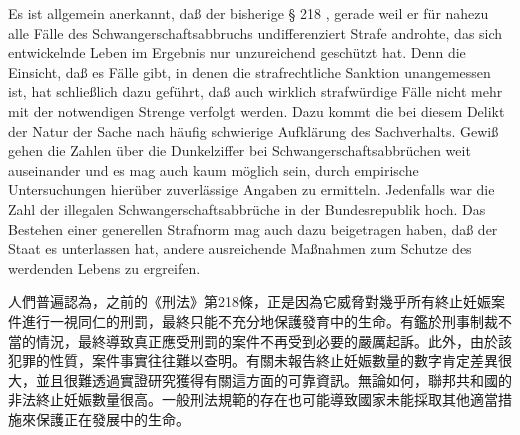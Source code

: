 \documentclass[12pt]{article}
\begin{document}
\syncleft
\begin{sourcepara}
Es ist allgemein anerkannt, daß der bisherige § 218 \abbrStGB{}, gerade weil er für nahezu alle Fälle des Schwangerschaftsabbruchs undifferenziert Strafe androhte, das sich entwickelnde Leben im Ergebnis nur unzureichend geschützt hat. Denn die Einsicht, daß es Fälle gibt, in denen die strafrechtliche Sanktion unangemessen ist, hat schließlich dazu geführt, daß auch wirklich strafwürdige Fälle nicht mehr mit der notwendigen Strenge verfolgt werden. Dazu kommt die bei diesem Delikt der Natur der Sache nach häufig schwierige Aufklärung des Sachverhalts. Gewiß gehen die Zahlen über die Dunkelziffer bei Schwangerschaftsabbrüchen weit auseinander und es mag auch kaum möglich sein, durch empirische Untersuchungen hierüber zuverlässige Angaben zu ermitteln. Jedenfalls war die Zahl der illegalen Schwangerschaftsabbrüche in der Bundesrepublik hoch. Das Bestehen einer generellen Strafnorm mag auch dazu beigetragen haben, daß der Staat es unterlassen hat, andere ausreichende Maßnahmen zum Schutze des werdenden Lebens zu ergreifen.
\end{sourcepara}
\begin{transpara}
人們普遍認為，之前的《刑法》第218條，正是因為它威脅對幾乎所有終止妊娠案件進行一視同仁的刑罰，最終只能不充分地保護發育中的生命。有鑑於刑事制裁不當的情況，最終導致真正應受刑罰的案件不再受到必要的嚴厲起訴。此外，由於該犯罪的性質，案件事實往往難以查明。有關未報告終止妊娠數量的數字肯定差異很大，並且很難透過實證研究獲得有關這方面的可靠資訊。無論如何，聯邦共和國的非法終止妊娠數量很高。一般刑法規範的存在也可能導致國家未能採取其他適當措施來保護正在發展中的生命。
\end{transpara}
\end{document}
